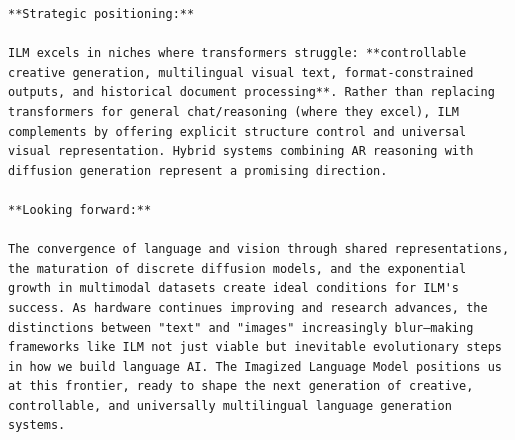 \documentclass[11pt]{article}
\begin{document}
\begin{verbatim}
**Strategic positioning:**

ILM excels in niches where transformers struggle: **controllable creative generation, multilingual visual text, format-constrained outputs, and historical document processing**. Rather than replacing transformers for general chat/reasoning (where they excel), ILM complements by offering explicit structure control and universal visual representation. Hybrid systems combining AR reasoning with diffusion generation represent a promising direction.

**Looking forward:**

The convergence of language and vision through shared representations, the maturation of discrete diffusion models, and the exponential growth in multimodal datasets create ideal conditions for ILM's success. As hardware continues improving and research advances, the distinctions between "text" and "images" increasingly blur—making frameworks like ILM not just viable but inevitable evolutionary steps in how we build language AI. The Imagized Language Model positions us at this frontier, ready to shape the next generation of creative, controllable, and universally multilingual language generation systems.
\end{verbatim}
\normalsize
\end{document}

